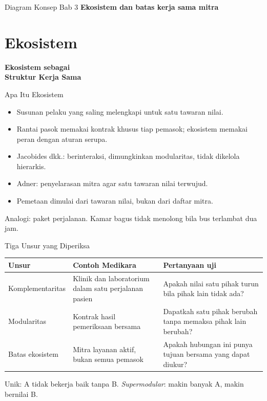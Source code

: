 \documentclass[aspectratio=169, table, 12pt]{beamer}
\begin{document}
\begin{frame}{{\Large Diagram Konsep Bab 3}}
  \centering
  {\small\bfseries Ekosistem dan batas kerja sama mitra}\par\medskip
\end{frame}

\section{Ekosistem}

\begin{frame}{\hfill}
  \centering
  \Huge{\textbf{Ekosistem sebagai\\Struktur Kerja Sama}}
\end{frame}

\begin{frame}{{\Large Apa Itu Ekosistem}}
  \vspace{10pt}
  \begin{itemize}
    \item Susunan pelaku yang saling melengkapi untuk satu tawaran nilai.
    \item Rantai pasok memakai kontrak khusus tiap pemasok; ekosistem memakai peran dengan aturan serupa.
    \item Jacobides dkk.: berinteraksi, dimungkinkan modularitas, tidak dikelola hierarkis.
    \item Adner: penyelarasan mitra agar satu tawaran nilai terwujud.
    \item Pemetaan dimulai dari tawaran nilai, bukan dari daftar mitra.
  \end{itemize}
  \vspace{6pt}
  {\small Analogi: paket perjalanan. Kamar bagus tidak menolong bila bus terlambat dua jam.}
\end{frame}

\begin{frame}{{\Large Tiga Unsur yang Diperiksa}}
  \footnotesize
  \begin{tabularx}{\textwidth}{>{\raggedright\arraybackslash}p{3.3cm}
      >{\raggedright\arraybackslash}X >{\raggedright\arraybackslash}X}
    \hline
    \textbf{Unsur} & \textbf{Contoh Medikara} & \textbf{Pertanyaan uji} \\ \hline
    Komplementaritas & Klinik dan laboratorium dalam satu perjalanan pasien & Apakah nilai satu pihak turun bila pihak lain tidak ada? \\ \hline
    Modularitas & Kontrak hasil pemeriksaan bersama & Dapatkah satu pihak berubah tanpa memaksa pihak lain berubah? \\ \hline
    Batas ekosistem & Mitra layanan aktif, bukan semua pemasok & Apakah hubungan ini punya tujuan bersama yang dapat diukur? \\ \hline
  \end{tabularx}

  \vspace{8pt}
  \small Unik: A tidak bekerja baik tanpa B. \textit{Supermodular}: makin banyak A, makin bernilai B.
\end{frame}
\end{document}
